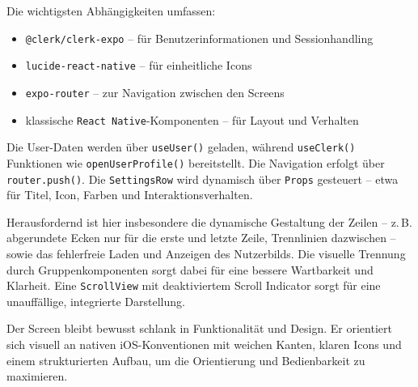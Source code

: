 Die wichtigsten Abhängigkeiten umfassen:

\begin{itemize}
    \item \texttt{@clerk/clerk-expo} – für Benutzerinformationen und Sessionhandling
    \item \texttt{lucide-react-native} – für einheitliche Icons
    \item \texttt{expo-router} – zur Navigation zwischen den Screens
    \item klassische \texttt{React Native}-Komponenten – für Layout und Verhalten
\end{itemize}

Die User-Daten werden über \texttt{useUser()} geladen, während \texttt{useClerk()} Funktionen wie \texttt{openUserProfile()} bereitstellt. Die Navigation erfolgt über \texttt{router.push()}. Die \texttt{SettingsRow} wird dynamisch über \texttt{Props} gesteuert – etwa für Titel, Icon, Farben und Interaktionsverhalten.

Herausfordernd ist hier insbesondere die dynamische Gestaltung der Zeilen – z.\,B. abgerundete Ecken nur für die erste und letzte Zeile, Trennlinien dazwischen – sowie das fehlerfreie Laden und Anzeigen des Nutzerbilds. Die visuelle Trennung durch Gruppenkomponenten sorgt dabei für eine bessere Wartbarkeit und Klarheit. Eine \texttt{ScrollView} mit deaktiviertem Scroll Indicator sorgt für eine unauffällige, integrierte Darstellung.

Der Screen bleibt bewusst schlank in Funktionalität und Design. Er orientiert sich visuell an nativen iOS-Konventionen mit weichen Kanten, klaren Icons und einem strukturierten Aufbau, um die Orientierung und Bedienbarkeit zu maximieren.
